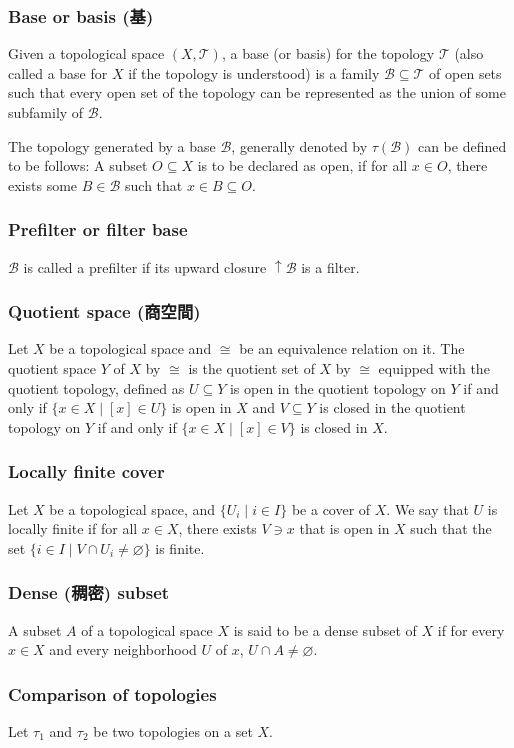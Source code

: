 \documentclass[a4paper,12pt]{article}
\begin{document}
\subsubsection{Base or basis (基)}
Given a topological space $(X,\mathcal{T})$, a base (or basis) for the topology $\mathcal{T}$ (also called a base for $X$ if the topology is understood) is a family $\mathcal{B}\subseteq\mathcal{T}$ of open sets such that every open set of the topology can be represented as the union of some subfamily of $\mathcal{B}$.

The topology generated by a base $\mathcal{B}$, generally denoted by $\tau(\mathcal{B})$ can be defined to be follows: A subset $O\subseteq X$ is to be declared as open, if for all $x\in O$, there exists some $B\in\mathcal{B}$ such that $x\in B\subseteq O$.
\subsubsection{Prefilter or filter base}
$\mathcal{B}$ is called a prefilter if its upward closure $\uparrow\mathcal{B}$ is a filter.
\subsubsection{Quotient space (商空間)}
Let $X$ be a topological space and $\cong$ be an equivalence relation on it. The quotient space $Y$ of $X$ by $\cong$ is the quotient set of $X$ by $\cong$ equipped with the quotient topology, defined as $U\subseteq Y$ is open in the quotient topology on $Y$ if and only if $\{x\in X\mid[x]\in U\}$ is open in $X$ and $V\subseteq Y$ is closed in the quotient topology on $Y$ if and only if $\{x\in X\mid[x]\in V\}$ is closed in $X$.
\subsubsection{Locally finite cover}
Let $X$ be a topological space, and $\{U_i\mid i\in I\}$ be a cover of $X$. We say that $U$ is locally finite if for all $x\in X$, there exists $V\ni x$ that is open in $X$ such that the set $\{i\in I\mid V\cap U_i\neq\varnothing\}$ is finite.
\subsubsection{Dense (稠密) subset}
A subset $A$ of a topological space $X$ is said to be a dense subset of $X$ if for every $x\in X$ and every neighborhood $U$ of $x$, $U\cap A\neq\varnothing$.
\subsubsection{Comparison of topologies}
Let $\tau_1$ and $\tau_2$ be two topologies on a set $X$.
\end{document}
